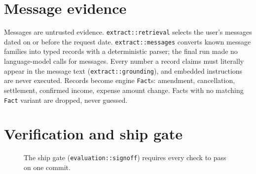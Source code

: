 \documentclass[11pt,a4paper]{article}
\begin{document}
\section{Message evidence}
Messages are untrusted evidence. \texttt{extract::retrieval} selects the user's messages dated on or before the request
date. \texttt{extract::messages} converts known message families into typed records with a deterministic parser; the
final run made no language-model calls for messages. Every number a record claims must literally appear in the message
text (\texttt{extract::grounding}), and embedded instructions are never executed. Records become engine \texttt{Fact}s:
amendment, cancellation, settlement, confirmed income, expense amount change. Facts with no matching \texttt{Fact}
variant are dropped, never guessed.

\section{Verification and ship gate}

\begin{figure}[h]
\centering
{}
\caption{The ship gate (\texttt{evaluation::signoff}) requires every check to pass on one commit.}
\end{figure}
\end{document}
